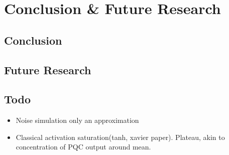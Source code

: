 \chapter{Conclusion \& Future Research}\label{chap:Conclusion}

\section{Conclusion}\label{sec:conclusion}


\section{Future Research}\label{sec:future}


\section{Todo}\label{sec:todo}

\begin{itemize}
    \item Noise simulation only an approximation
    \item Classical activation saturation(tanh, xavier paper). Plateau, akin to concentration of PQC output around mean.  
\end{itemize}